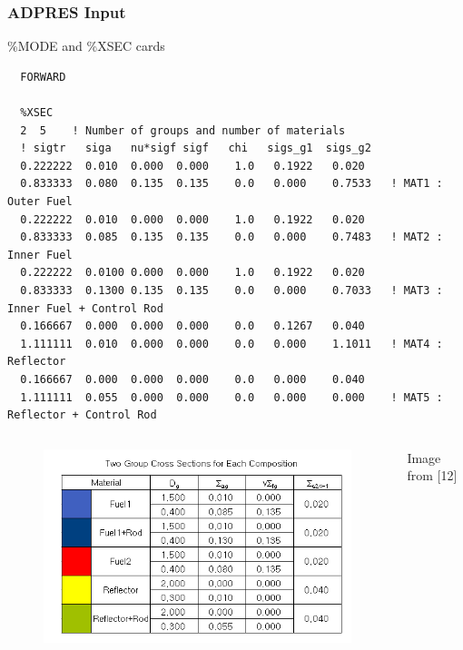 \documentclass{beamer}
\begin{document}
\begin{frame}[fragile] %
\frametitle{ADPRES Input}
\begin{block}{\%MODE and \%XSEC cards}
\begin{Verbatim}[fontsize=\tiny]
  %MODE
  FORWARD

  %XSEC
  2  5    ! Number of groups and number of materials
  ! sigtr   siga   nu*sigf sigf   chi   sigs_g1  sigs_g2
  0.222222  0.010  0.000  0.000    1.0   0.1922   0.020
  0.833333  0.080  0.135  0.135    0.0   0.000    0.7533   ! MAT1 : Outer Fuel
  0.222222  0.010  0.000  0.000    1.0   0.1922   0.020
  0.833333  0.085  0.135  0.135    0.0   0.000    0.7483   ! MAT2 : Inner Fuel
  0.222222  0.0100 0.000  0.000    1.0   0.1922   0.020
  0.833333  0.1300 0.135  0.135    0.0   0.000    0.7033   ! MAT3 : Inner Fuel + Control Rod
  0.166667  0.000  0.000  0.000    0.0   0.1267   0.040
  1.111111  0.010  0.000  0.000    0.0   0.000    1.1011   ! MAT4 : Reflector
  0.166667  0.000  0.000  0.000    0.0   0.000    0.040
  1.111111  0.055  0.000  0.000    0.0   0.000    0.000    ! MAT5 : Reflector + Control Rod
\end{Verbatim}
\end{block}
\begin{columns}[c] %
\begin{figure}
\includegraphics[width=0.5\linewidth]{xsec.png}
\end{figure}
Image from [12]
\end{columns}
\end{frame}

\end{document}
